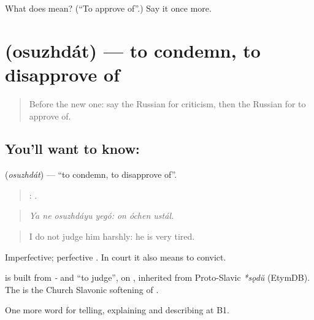 \begin{tcolorbox}[breakable,colback=teal!4,colframe=teal!35!black,title={Before you move on}]
What does  mean? (\textquotedblleft{}To approve of\textquotedblright{}.) Say it once more.
\end{tcolorbox}
\section[\texorpdfstring{\ru{осуждать} (osuzhdát)}{осуждать (osuzhdát)}]{ (osuzhdát) — to condemn, to disapprove of}

\label{lesson:RU-C343-osuzhdat}



\begin{quote}
Before the new one: say the Russian for criticism, then the Russian for to approve of.
\end{quote}

\subsection*{You'll want to know: }
\textbf{} (\emph{osuzhdát}) — \textquotedblleft{}to condemn, to disapprove of\textquotedblright{}.

\begin{quote}
   :   .
\end{quote}

\begin{quote}
\emph{Ya ne osuzhdáyu yegó: on óchen ustál.}
\end{quote}

\begin{quote}
I do not judge him harshly: he is very tired.
\end{quote}

Imperfective; perfective \emph{}. In court it also means to convict.

\begin{cousinweb}
\textbf{} is built from \emph{-} and \emph{} \textquotedblleft{}to judge\textquotedblright{}, on \emph{}, inherited from Proto-Slavic \emph{*sǫdŭ} (EtymDB). The \emph{} is the Church Slavonic softening of \emph{}.
\end{cousinweb}

\begin{grammarlens}[title={What you've built}]
One more word for telling, explaining and describing at B1.
\end{grammarlens}

